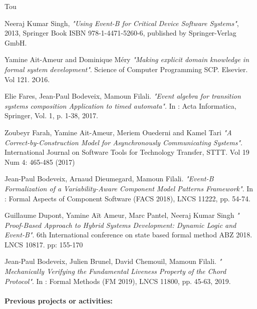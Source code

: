 \begin{sitedescription}{Tou}
\begin{compactitem}
\item Neeraj Kumar Singh, {\it "Using Event-B for Critical Device Software Systems"}, 2013, Springer Book ISBN 978-1-4471-5260-6, published by Springer-Verlag GmbH.
\item Yamine Ait-Ameur and Dominique M\'ery {\it "Making explicit domain knowledge in formal system development"}. Science of Computer Programming SCP. Elsevier. Vol 121.  2O16.
\item Elie Fares, Jean-Paul Bodeveix, Mamoun Filali. {\it "Event algebra for transition systems composition Application to timed automata"}. In : Acta Informatica, Springer, Vol. 1, p. 1-38,  2017. 
\item Zoubeyr Farah, Yamine Ait-Ameur, Meriem Ouederni and Kamel Tari {\it "A Correct-by-Construction Model for Asynchronously Communicating Systems"}. International Journal on Software Tools for Technology Transfer,  STTT. Vol 19 Num 4: 465-485 (2017)
\item Jean-Paul Bodeveix, Arnaud Dieumegard, Mamoun Filali. {\it "Event-B Formalization of a Variability-Aware Component Model Patterns Framework"}. In : Formal Aspects of Component Software (FACS 2018), LNCS 11222,  pp. 54-74. 
\item 	Guillaume Dupont, Yamine Aït Ameur, Marc Pantel, Neeraj Kumar Singh {\it " 
Proof-Based Approach to Hybrid Systems Development: Dynamic Logic and Event-B"}. 6th International conference on state based formal method ABZ 2018. LNCS 10817. pp: 155-170
\item Jean-Paul Bodeveix, Julien Brunel, David Chemouil, Mamoun Filali. {\it " Mechanically Verifying the Fundamental Liveness Property of the Chord Protocol"}. In : Formal Methods (FM 2019), LNCS  11800, pp. 45-63, 2019.
\end{compactitem}

 
\paragraph{Previous projects or activities:}


\end{sitedescription}
